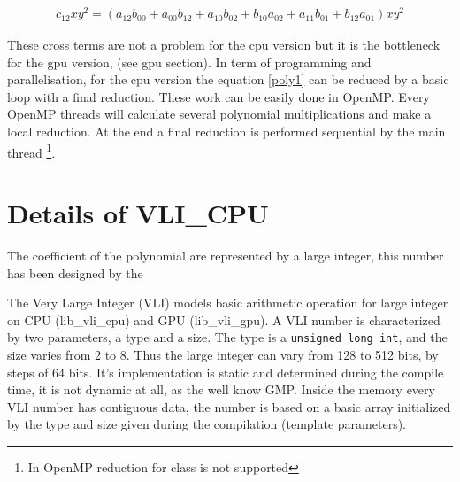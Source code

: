 \documentclass[11pt]{amsart}
\begin{document}
\begin{eqnarray}
c_{12}xy^2 = \left(a_{12}b_{00}  +  a_{00}b_{12} + a_{10}b_{02}   + b_{10}a_{02}  +  a_{11}b_{01} + b_{12}a_{01}  \right)xy^2
\end{eqnarray}

These cross terms are not a problem for the cpu version but it is the bottleneck for the gpu version, (see gpu section). In term of  programming and parallelisation, 
for the cpu version the equation  \ref{poly1} can be reduced by a basic loop with a final reduction. These work can be easily done in OpenMP. Every OpenMP threads
will calculate several  polynomial multiplications and make a local reduction. At the end a final reduction is performed sequential by the main thread \footnote{In OpenMP reduction for class is not supported}. 



\section*{Details of VLI\_CPU}

The coefficient of the polynomial are represented by a large integer, this number has been designed by the 

The Very Large Integer (VLI)  models  basic arithmetic  operation for large integer on CPU (lib\_vli\_cpu) and GPU (lib\_vli\_gpu).  A VLI number is characterized by two parameters, a type and a size.
 The type is a \texttt{unsigned long int}, and the size varies from 2 to 8.
Thus the large integer can vary from 128 to 512 bits, by steps of 64 bits. It's implementation is static and determined during the compile time, it is not dynamic at all, as the well know GMP. Inside the memory every VLI number has contiguous data, 
the number is based on a basic array initialized by the type and size given during the compilation (template parameters).
\end{document}
